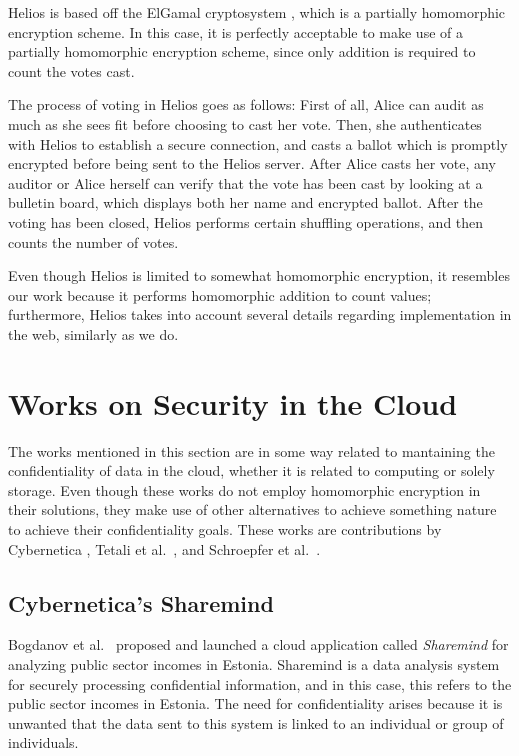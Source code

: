Helios is based off the ElGamal cryptosystem \cite{ElGamal:1985:PKC:19478.19480}, which is a partially homomorphic encryption scheme. In this case, it is perfectly acceptable to make use of a partially homomorphic encryption scheme, since only addition is required to count the votes cast. 

The process of voting in Helios goes as follows: First of all, Alice can audit as much as she sees fit before choosing to cast her vote.  Then, she authenticates with Helios to establish a secure connection, and casts a ballot which is promptly encrypted before being sent to the Helios server. After Alice casts her vote, any auditor or Alice herself can verify that the vote has been cast by looking at a bulletin board, which displays both her name and encrypted ballot. After the voting has been closed, Helios performs certain shuffling operations, and then counts the number of votes.

Even though Helios is limited to somewhat homomorphic encryption, it resembles our work because it performs homomorphic addition to count values; furthermore, Helios takes into account several details regarding implementation in the web, similarly as we do.

\section{{Works on Security in the Cloud}}
The works mentioned in this section are in some way related to mantaining the confidentiality of data in the cloud, whether it is related to computing or solely storage. Even though these works do not employ homomorphic encryption in their solutions, they make use of other alternatives to achieve something nature to achieve their confidentiality goals. These works are contributions by Cybernetica \cite{ESORICS08:BLW08}, Tetali et al.\ \cite{Tetali:2013:MSA:2544173.2509554}, and Schroepfer et al.\ \cite{Schroepfer:2011:DSC:2046707.2093509}.

\subsection{Cybernetica's Sharemind}
Bogdanov et al.\ \cite{ESORICS08:BLW08} proposed and launched a cloud application called \emph{Sharemind} for analyzing public sector incomes in Estonia. Sharemind is a data analysis system for securely processing confidential information, and in this case, this refers to the public sector incomes in Estonia. The need for confidentiality arises because it is unwanted that the data sent to this system is linked to an individual or group of individuals. 

